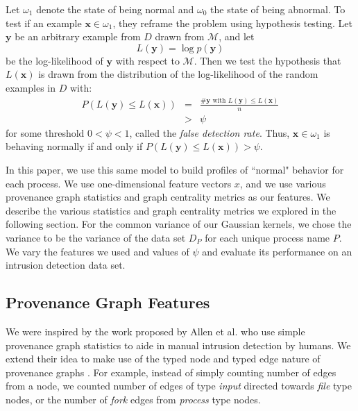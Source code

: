 \documentclass[10pt,twocolumn]{article}
\newcommand{\m}[1]{\mathbf{#1}}
\begin{document}
Let $\omega_1$ denote the state of being normal and $\omega_0$ the state of being abnormal.
To test if an example $\m{x} \in \omega_1$, they reframe the problem using hypothesis testing. Let $\m{y}$ be
an arbitrary example from $D$ drawn from $\mathcal{M}$, and let 
$$L(\m{y}) = \log p(\m{y})$$
be the log-likelihood of $\m{y}$ with respect to $\mathcal{M}$. Then we test the hypothesis that
$L(\m{x})$ is drawn from the distribution of the log-likelihood of the random examples in $D$ with:
\begin{eqnarray*}
P(L(\m{y}) \leq L(\m{x})) 
&=&  \frac{\#\m{y} \mbox { with } L(\m{y}) \leq L(\m{x})}{n} \\
&>& \psi
\end{eqnarray*}
for some threshold $0 < \psi < 1$, called the {\em false detection rate}. 
Thus, $\m{x} \in \omega_1$ is behaving normally if and only if $P(L(\m{y}) \leq L(\m{x})) > \psi$. 

In this paper, we use this same model to build profiles of ``normal" behavior for each process. We use
one-dimensional feature vectors $x$, and we use various provenance graph statistics and graph
centrality metrics as our features. We describe the various statistics and graph centrality metrics we explored
in the following section. For the common variance of our Gaussian kernels, we chose
the variance to be the variance of the data set $D_P$ for each unique process name $P$. 
We vary the features we used and values of $\psi$ and evaluate its performance on an intrusion detection data set.

\subsection{Provenance Graph Features}

We were inspired by the work proposed by Allen et al. who use simple provenance graph statistics to aide
in manual intrusion detection by humans. We extend their idea to make use of the typed node and typed edge
nature of provenance graphs \cite{provstat}. For example, instead of simply counting number of edges from a node, we
counted number of edges of type {\em input} directed towards {\em file} type nodes, or the number of {\em fork}
edges from {\em process} type nodes.
\end{document}
